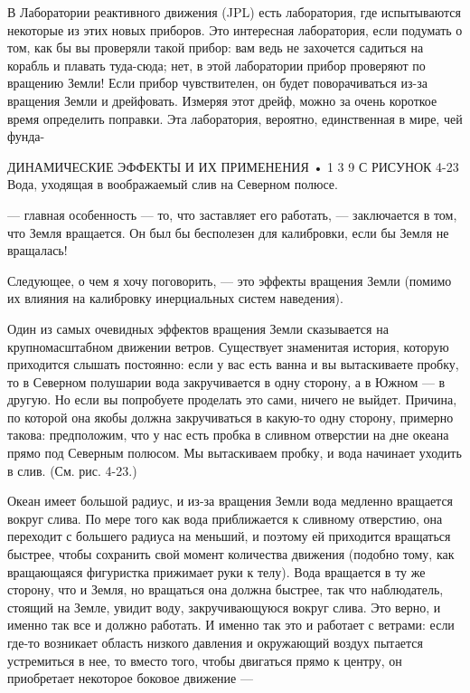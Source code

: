 \documentclass[10pt,oneside]{article}
\newcommand{\TipsSubsection}[1]{\par\vspace{6bp}{\normalsize\bfseries #1\par}\vspace{2bp}}
\begin{document}
В Лаборатории реактивного движения (JPL) есть лаборатория, где испытываются некоторые из этих новых приборов. Это интересная лаборатория, если подумать о том, как бы вы проверяли такой прибор: вам ведь не захочется садиться на корабль и плавать туда-сюда; нет, в этой лаборатории прибор проверяют по вращению Земли! Если прибор чувствителен, он будет поворачиваться из-за вращения Земли и дрейфовать. Измеряя этот дрейф, можно за очень короткое время определить поправки. Эта лаборатория, вероятно, единственная в мире, чей фунда-\par

ДИНАМИЧЕСКИЕ ЭФФЕКТЫ И ИХ ПРИМЕНЕНИЯ • 1 3 9 С РИСУНОК 4-23 Вода, уходящая в воображаемый слив на Северном полюсе.\par

--- главная особенность --- то, что заставляет его работать, --- заключается в том, что Земля вращается. Он был бы бесполезен для калибровки, если бы Земля не вращалась!\par

\TipsSubsection{4-9 Влияние вращения Земли}

Следующее, о чем я хочу поговорить, --- это эффекты вращения Земли (помимо их влияния на калибровку инерциальных систем наведения).\par

Один из самых очевидных эффектов вращения Земли сказывается на крупномасштабном движении ветров. Существует знаменитая история, которую приходится слышать постоянно: если у вас есть ванна и вы вытаскиваете пробку, то в Северном полушарии вода закручивается в одну сторону, а в Южном --- в другую. Но если вы попробуете проделать это сами, ничего не выйдет. Причина, по которой она якобы должна закручиваться в какую-то одну сторону, примерно такова: предположим, что у нас есть пробка в сливном отверстии на дне океана прямо под Северным полюсом. Мы вытаскиваем пробку, и вода начинает уходить в слив. (См. рис. 4-23.)\par

Океан имеет большой радиус, и из-за вращения Земли вода медленно вращается вокруг слива. По мере того как вода приближается к сливному отверстию, она переходит с большего радиуса на меньший, и поэтому ей приходится вращаться быстрее, чтобы сохранить свой момент количества движения (подобно тому, как вращающаяся фигуристка прижимает руки к телу). Вода вращается в ту же сторону, что и Земля, но вращаться она должна быстрее, так что наблюдатель, стоящий на Земле, увидит воду, закручивающуюся вокруг слива. Это верно, и именно так все и должно работать. И именно так это и работает с ветрами: если где-то возникает область низкого давления и окружающий воздух пытается устремиться в нее, то вместо того, чтобы двигаться прямо к центру, он приобретает некоторое боковое движение ---\par
\end{document}
